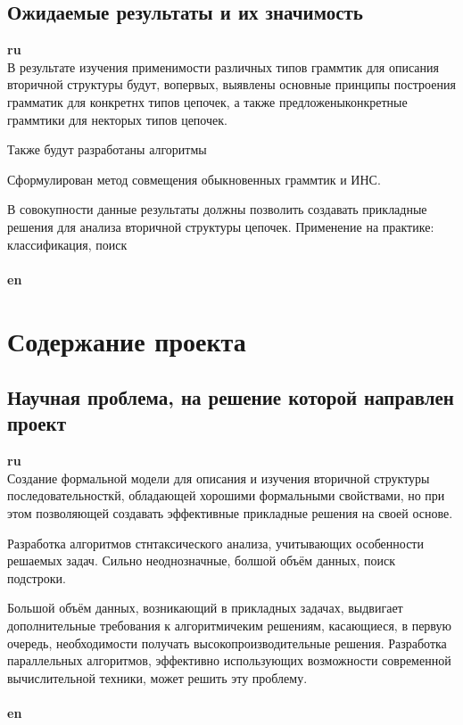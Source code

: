 \documentclass[12pt]{article}  %
\theoremstyle{remark}
\begin{document}
\subsection{Ожидаемые результаты и их значимость}

\textbf{ru}\\
В результате изучения применимости различных типов граммтик для описания вторичной структуры будут, вопервых, выявлены основные принципы построения грамматик для конкретнх типов цепочек, а также предложеныконкретные граммтики для некторых типов цепочек.

Также будут разработаны алгоритмы

Сформулирован метод совмещения обыкновенных граммтик и ИНС.

В совокупности данные результаты должны позволить создавать прикладные решения для анализа вторичной структуры цепочек.
Применение на практике: классификация, поиск
\\
\\
\textbf{en}\\


\section{Содержание проекта}

\subsection{Научная проблема, на решение которой направлен проект}

\textbf{ru}\\
Создание формальной модели для описания и изучения вторичной структуры последовательносткй, обладающей хорошими формальными свойствами, но при этом позволяющей создавать эффективные прикладные решения на своей основе.

Разработка алгоритмов стнтаксического анализа, учитывающих особенности решаемых задач.
Сильно неоднозначные, болшой объём данных, поиск подстроки.

Большой объём данных, возникающий в прикладных задачах, выдвигает дополнительные требования к алгоритмичеким решениям, касающиеся, в первую очередь, необходимости получать высокопроизводительные решения.
Разработка параллельных алгоритмов, эффективно использующих возможности современной вычислительной техники, может решить эту проблему.
\\
\\
\textbf{en}\\
\end{document}
